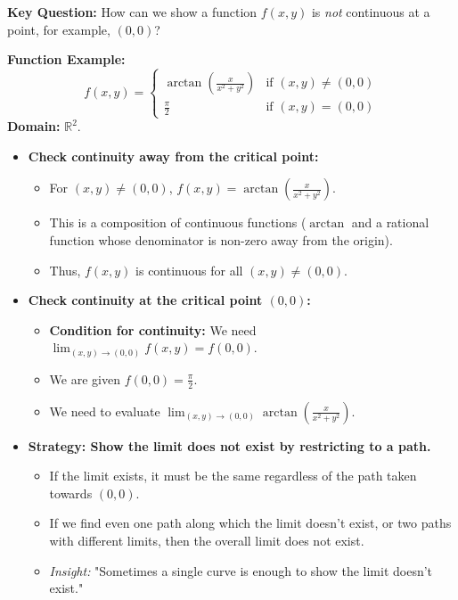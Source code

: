 \hfill

\begin{cascade}
	\textbf{Key Question:} How can we show a function $f(x, y)$ is \textit{not} continuous at a point, for example, $(0,0)$?

	\textbf{Function Example:}
	\[ f(x, y) = \begin{cases} \arctan\left(\frac{x}{x^2 + y^2}\right) & \text{if } (x, y) \neq (0, 0) \\ \frac{\pi}{2} & \text{if } (x, y) = (0, 0) \end{cases} \]
	\textbf{Domain:} $\mathbb{R}^2$.
	\begin{itemize}
		\item \textbf{Check continuity away from the critical point:}
		      \begin{itemize}
			      \item For $(x, y) \neq (0, 0)$, $f(x, y) = \arctan\left(\frac{x}{x^2 + y^2}\right)$.
			      \item This is a composition of continuous functions ($\arctan$ and a rational function whose denominator is non-zero away from the origin).
			      \item Thus, $f(x, y)$ is continuous for all $(x, y) \neq (0, 0)$.
		      \end{itemize}
		\item \textbf{Check continuity at the critical point $(0, 0)$:}
		      \begin{itemize}
			      \item \textbf{Condition for continuity:} We need $\lim_{(x,y) \to (0,0)} f(x, y) = f(0, 0)$.
			      \item We are given $f(0, 0) = \frac{\pi}{2}$.
			      \item We need to evaluate $\lim_{(x,y) \to (0,0)} \arctan\left(\frac{x}{x^2 + y^2}\right)$.
		      \end{itemize}
		\item \textbf{Strategy: Show the limit does not exist by restricting to a path.}
		      \begin{itemize}
			      \item If the limit exists, it must be the same regardless of the path taken towards $(0,0)$.
			      \item If we find even one path along which the limit doesn't exist, or two paths with different limits, then the overall limit does not exist.
			      \item \textit{Insight:} "Sometimes a single curve is enough to show the limit doesn't exist."

\end{itemize}
\end{itemize}
\end{cascade}

